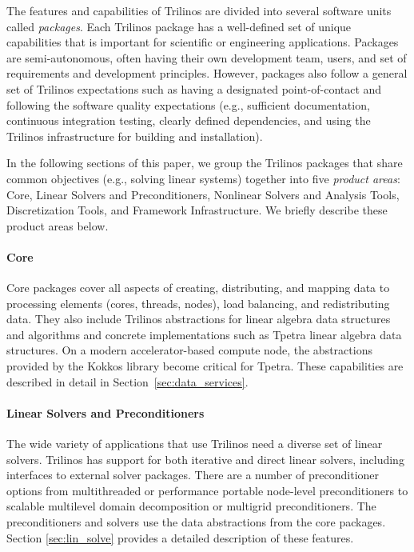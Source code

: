 
The features and capabilities of Trilinos are divided into several software units called \textit{packages}.
Each Trilinos package has a well-defined set of unique capabilities that is important for scientific or engineering applications. Packages are semi-autonomous, often having their own development team, users, and set of requirements and development principles.  However, packages also follow a general set of Trilinos expectations such as having a designated point-of-contact and following the software quality expectations (e.g., sufficient documentation, continuous integration testing, clearly defined dependencies, and using the Trilinos infrastructure for building and installation).

In the following sections of this paper, we group the Trilinos packages that share common objectives (e.g., solving linear systems) together into five \textit{product areas}:  Core, Linear Solvers and Preconditioners, Nonlinear Solvers and Analysis Tools, Discretization Tools, and Framework Infrastructure.  We briefly describe these product areas below.

\paragraph{Core} Core packages cover all aspects of creating, distributing, and mapping data to processing elements (cores, threads, nodes), load balancing, and redistributing data. They also include Trilinos abstractions for linear algebra data structures and algorithms and concrete implementations such as Tpetra linear algebra data structures. On a modern accelerator-based compute node, the abstractions provided by the Kokkos library become critical for Tpetra. These capabilities are described in detail in Section~\ref{sec:data_services}.

\paragraph{Linear Solvers and Preconditioners} The wide variety of applications that use Trilinos need a diverse set of linear solvers. Trilinos has support for both iterative and direct linear solvers, including interfaces to external solver packages. There are a number of preconditioner options from multithreaded or performance portable node-level preconditioners to scalable multilevel domain decomposition or multigrid preconditioners. The preconditioners and solvers use the data abstractions from the core packages. Section \ref{sec:lin_solve} provides a detailed description of these features.

